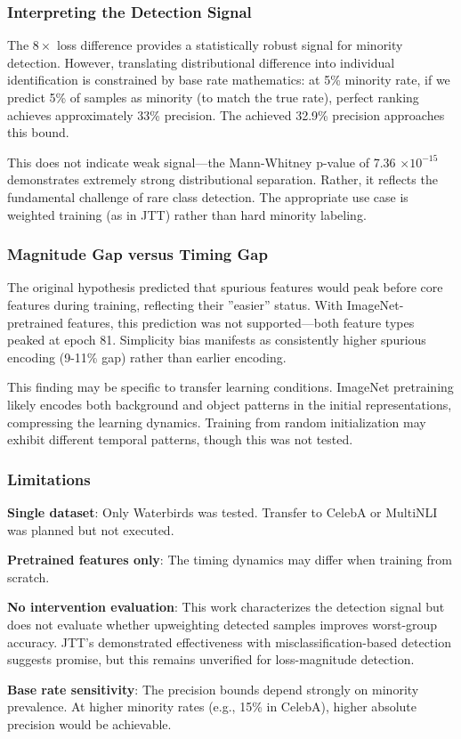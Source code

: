 
\subsubsection{Interpreting the Detection Signal}

The $8\times$ loss difference provides a statistically robust signal for minority detection. However, translating distributional difference into individual identification is constrained by base rate mathematics: at 5\% minority rate, if we predict 5\% of samples as minority (to match the true rate), perfect ranking achieves approximately 33\% precision. The achieved 32.9\% precision approaches this bound.

This does not indicate weak signal---the Mann-Whitney p-value of 7.36 $\times 10^{-15}$ demonstrates extremely strong distributional separation. Rather, it reflects the fundamental challenge of rare class detection. The appropriate use case is weighted training (as in JTT) rather than hard minority labeling.

\subsubsection{Magnitude Gap versus Timing Gap}

The original hypothesis predicted that spurious features would peak before core features during training, reflecting their ''easier'' status. With ImageNet-pretrained features, this prediction was not supported---both feature types peaked at epoch 81. Simplicity bias manifests as consistently higher spurious encoding (9-11\% gap) rather than earlier encoding.

This finding may be specific to transfer learning conditions. ImageNet pretraining likely encodes both background and object patterns in the initial representations, compressing the learning dynamics. Training from random initialization may exhibit different temporal patterns, though this was not tested.

\subsubsection{Limitations}

\textbf{Single dataset}: Only Waterbirds was tested. Transfer to CelebA or MultiNLI was planned but not executed.

\textbf{Pretrained features only}: The timing dynamics may differ when training from scratch.

\textbf{No intervention evaluation}: This work characterizes the detection signal but does not evaluate whether upweighting detected samples improves worst-group accuracy. JTT's demonstrated effectiveness with misclassification-based detection suggests promise, but this remains unverified for loss-magnitude detection.

\textbf{Base rate sensitivity}: The precision bounds depend strongly on minority prevalence. At higher minority rates (e.g., 15\% in CelebA), higher absolute precision would be achievable.

